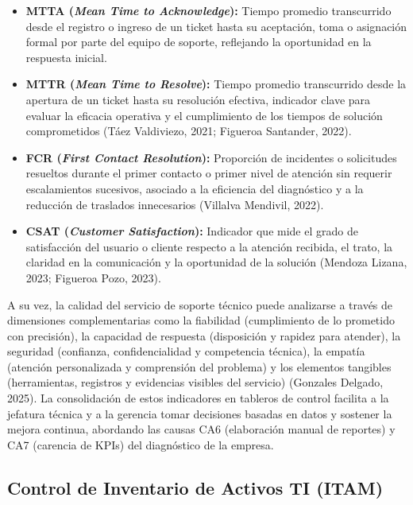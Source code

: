 \begin{itemize}[leftmargin=1.27cm]
 \item \textbf{MTTA (\textit{Mean Time to Acknowledge}):} Tiempo promedio transcurrido desde el registro o ingreso de un ticket hasta su aceptación, toma o asignación formal por parte del equipo de soporte, reflejando la oportunidad en la respuesta inicial.
 
 \item \textbf{MTTR (\textit{Mean Time to Resolve}):} Tiempo promedio transcurrido desde la apertura de un ticket hasta su resolución efectiva, indicador clave para evaluar la eficacia operativa y el cumplimiento de los tiempos de solución comprometidos (Táez Valdiviezo, 2021; Figueroa Santander, 2022).
 
 \item \textbf{FCR (\textit{First Contact Resolution}):} Proporción de incidentes o solicitudes resueltos durante el primer contacto o primer nivel de atención sin requerir escalamientos sucesivos, asociado a la eficiencia del diagnóstico y a la reducción de traslados innecesarios (Villalva Mendivil, 2022).
 
 \item \textbf{CSAT (\textit{Customer Satisfaction}):} Indicador que mide el grado de satisfacción del usuario o cliente respecto a la atención recibida, el trato, la claridad en la comunicación y la oportunidad de la solución (Mendoza Lizana, 2023; Figueroa Pozo, 2023).
\end{itemize}

A su vez, la calidad del servicio de soporte técnico puede analizarse a través de dimensiones complementarias como la fiabilidad (cumplimiento de lo prometido con precisión), la capacidad de respuesta (disposición y rapidez para atender), la seguridad (confianza, confidencialidad y competencia técnica), la empatía (atención personalizada y comprensión del problema) y los elementos tangibles (herramientas, registros y evidencias visibles del servicio) (Gonzales Delgado, 2025). La consolidación de estos indicadores en tableros de control facilita a la jefatura técnica y a la gerencia tomar decisiones basadas en datos y sostener la mejora continua, abordando las causas CA6 (elaboración manual de reportes) y CA7 (carencia de KPIs) del diagnóstico de la empresa.

\subsection{Control de Inventario de Activos TI (ITAM)}

